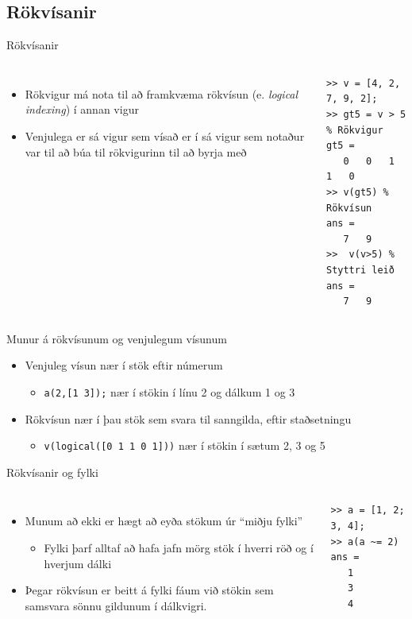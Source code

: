 \documentclass[handout]{beamer}
\begin{document}
\subsection{Rökvísanir}
\begin{frame}[fragile]{Rökvísanir}
\begin{columns}
\begin{itemize}
 \item Rökvigur má nota til að framkvæma rökvísun (e. \emph{logical indexing}) í annan vigur
 \item Venjulega er sá vigur sem vísað er í sá vigur sem notaður var til að búa til rökvigurinn til að byrja með
\end{itemize}
\begin{verbatim}
>> v = [4, 2, 7, 9, 2];
>> gt5 = v > 5 % Rökvigur
gt5 =
   0   0   1   1   0
>> v(gt5) % Rökvísun
ans =
   7   9
>>  v(v>5) % Styttri leið
ans =
   7   9
\end{verbatim}
\end{columns}
\end{frame}

\begin{frame}{Munur á rökvísunum og venjulegum vísunum}
\begin{itemize}
 \item Venjuleg vísun nær í stök eftir númerum
 \begin{itemize}
  \item \texttt{a(2,[1 3]);} nær í stökin í línu 2 og dálkum 1 og 3
 \end{itemize}
 \item Rökvísun nær í þau stök sem svara til sanngilda, eftir staðsetningu
 \begin{itemize}
  \item \texttt{v(logical([0 1 1 0 1]))} nær í stökin í sætum 2, 3 og 5
 \end{itemize}
\end{itemize}
\end{frame}

\begin{frame}[fragile]{Rökvísanir og fylki}
\begin{columns}
\begin{itemize}
 \item Munum að ekki er hægt að eyða stökum úr ``miðju fylki''
 \begin{itemize}
  \item Fylki þarf alltaf að hafa jafn mörg stök í hverri röð og í hverjum dálki
 \end{itemize}
 \item Þegar rökvísun er beitt á fylki fáum við stökin sem samsvara sönnu gildunum í dálkvigri.
\end{itemize}
\begin{verbatim}
>> a = [1, 2; 3, 4];
>> a(a ~= 2)
ans =
   1
   3
   4
\end{verbatim}
\end{columns}
\end{frame}
\end{document}

